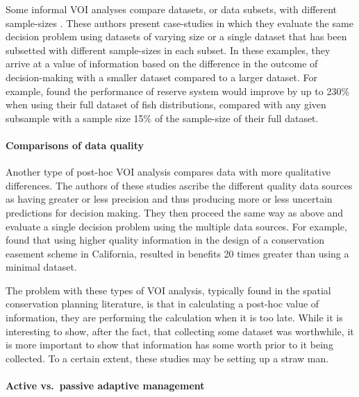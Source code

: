 \documentclass[]{article}
\theoremstyle{definition}
\theoremstyle{definition}
\theoremstyle{definition}
\theoremstyle{remark}
\begin{document}
Some informal VOI analyses compare datasets, or data subsets, with
different sample-sizes
\citep[e.g.,][]{Grantham2008, Grantham2009, Hermoso2013}. These authors
present case-studies in which they evaluate the same decision problem
using datasets of varying size or a single dataset that has been
subsetted with different sample-sizes in each subset. In these examples,
they arrive at a value of information based on the difference in the
outcome of decision-making with a smaller dataset compared to a larger
dataset. For example, \citet{Hermoso2013} found the performance of
reserve system would improve by up to 230\% when using their full
dataset of fish distributions, compared with any given subsample with a
sample size 15\% of the sample-size of their full dataset.

\paragraph*{Comparisons of data
quality}\label{comparisons-of-data-quality}

Another type of post-hoc VOI analysis compares data with more
qualitative differences. The authors of these studies ascribe the
different quality data sources as having greater or less precision and
thus producing more or less uncertain predictions for decision making.
They then proceed the same way as above and evaluate a single decision
problem using the multiple data sources. For example, \citet{Stoms2011}
found that using higher quality information in the design of a
conservation easement scheme in California, resulted in benefits 20
times greater than using a minimal dataset.

The problem with these types of VOI analysis, typically found in the
spatial conservation planning literature, is that in calculating a
post-hoc value of information, they are performing the calculation when
it is too late. While it is interesting to show, after the fact, that
collecting some dataset was worthwhile, it is more important to show
that information has some worth prior to it being collected. To a
certain extent, these studies may be setting up a straw man.

\paragraph*{Active vs.~passive adaptive
management}\label{active-vs.passive-adaptive-management}
\end{document}
